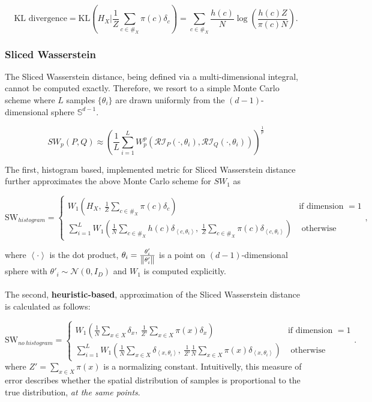 \[\text{KL divergence} = \text{KL} \left(H_X \bigg| \frac 1 Z \sum_{c \in \#_X} \pi(c) \delta_c\right) =  \sum_{c \in \#_X} \frac{h(c)}{N} \log\left(\frac {h(c) Z} {\pi(c) N} \right).\]

\subsubsection{Sliced Wasserstein}

The Sliced Wasserstein distance, being defined via a multi-dimensional integral, cannot be computed exactly. Therefore, we resort to a simple Monte Carlo scheme where $L$ samples $\{\theta_i\}$ are drawn uniformly from the $(d-1)$-dimensional sphere $\mathbb S^{d-1}$.

$$ 
SW_p(P, Q) \approx \left( \frac 1 L \sum_{i=1}^L W_p^p\left(\mathcal{RI}_P(\cdot, \theta_i), \mathcal{RI}_Q(\cdot, \theta_i) \right) \right)^{\frac 1 p}
$$

The first, histogram based, implemented metric for Sliced Wasserstein distance further approximates the above Monte Carlo scheme for $SW_1$ as

\[\text{SW}_{histogram} = \begin{cases}
W_1 \left( H_X,\  \frac 1 Z \sum_{c \in \#_X} \pi(c) \delta_c \right) & \text{if dimension } = 1 \\
\sum_{i = 1}^L W_1 \left( \frac 1 N \sum_{c \in \#_X} h(c) \delta_{\left<c, \theta_i \right>},\  \frac 1 Z \sum_{c \in \#_X} \pi(c) \delta_{\left<c, \theta_i \right>}  \right) & \text{ otherwise }
\end{cases},\]

where $\left< \cdot \right>$ is the dot product, $\theta_i = \frac{\theta'_i}{\norm{\theta'_i}}$ is a point on $(d-1)$-dimensional sphere with $
\theta'_i \sim \mathcal N(0, I_D)$ and $W_1$ is computed explicitly. \\\\

The second, \textbf{heuristic-based}, approximation of the Sliced Wasserstein distance is calculated as follows:

\[\text{SW}_{no\ histogram} = \begin{cases}
W_1 \left( \frac 1 N \sum_{x \in X} \delta_x,\  \frac 1 {Z'} \sum_{x \in X} \pi(x) \delta_x \right) & \text{if dimension } = 1 \\
\sum_{i = 1}^L W_1 \left(  \frac 1 N \sum_{x \in X} \delta_{\left<x, \theta_i \right>},\ \frac 1 {Z'} \frac 1 N \sum_{x \in X} \pi(x) \delta_{\left<x, \theta_i \right>}  \right) & \text{ otherwise }
\end{cases}.\]
where $Z' = \sum_{x \in X} \pi(x) $ is a normalizing constant. Intuitivelly, this measure of error describes whether the spatial distribution of samples is proportional to the true distribution, \textit{at the same points}.


